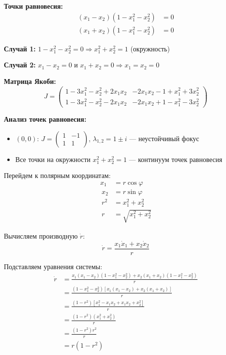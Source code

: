 \textbf{Точки равновесия:}
\begin{align}
(x_1 - x_2)(1 - x_1^2 - x_2^2) &= 0 \\
(x_1 + x_2)(1 - x_1^2 - x_2^2) &= 0
\end{align}

\textbf{Случай 1:} $1 - x_1^2 - x_2^2 = 0 \Rightarrow x_1^2 + x_2^2 = 1$ (окружность)

\textbf{Случай 2:} $x_1 - x_2 = 0$ и $x_1 + x_2 = 0 \Rightarrow x_1 = x_2 = 0$

\textbf{Матрица Якоби:}
$$J = \begin{pmatrix} 1-3x_1^2-x_2^2+2x_1x_2 & -2x_1x_2-1+x_1^2+3x_2^2 \\ 1-3x_1^2-x_2^2-2x_1x_2 & -2x_1x_2+1-x_1^2-3x_2^2 \end{pmatrix}$$

\textbf{Анализ точек равновесия:}
\begin{itemize}
\item $(0, 0)$: $J = \begin{pmatrix} 1 & -1 \\ 1 & 1 \end{pmatrix}$, $\lambda_{1,2} = 1 \pm i$ --- неустойчивый фокус
\item Все точки на окружности $x_1^2 + x_2^2 = 1$ --- континуум точек равновесия
\end{itemize}

Перейдем к полярным координатам:
\begin{align}
x_1 &= r\cos\varphi \\\
x_2 &= r\sin\varphi \\\
r^2 &= x_1^2 + x_2^2 \\\
r &= \sqrt{x_1^2 + x_2^2}
\end{align}

Вычисляем производную $\dot{r}$:
$$\dot{r} = \frac{x_1\dot{x}_1 + x_2\dot{x}_2}{r}$$

Подставляем уравнения системы:
\begin{align}
\dot{r} &= \frac{x_1(x_1 - x_2)(1 - x_1^2 - x_2^2) + x_2(x_1 + x_2)(1 - x_1^2 - x_2^2)}{r} \\\
&= \frac{(1 - x_1^2 - x_2^2)[x_1(x_1 - x_2) + x_2(x_1 + x_2)]}{r} \\\
&= \frac{(1 - r^2)[x_1^2 - x_1x_2 + x_1x_2 + x_2^2]}{r} \\\
&= \frac{(1 - r^2)(x_1^2 + x_2^2)}{r} \\\
&= \frac{(1 - r^2)r^2}{r} \\\
&= r(1 - r^2)
\end{align}

